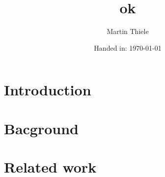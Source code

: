 \documentclass[11pt, a4paper]{memoir}
\author{Martin Thiele}
\title{ok}
\subtitle{} %
\date{Handed in: \today}
\begin{document}
\maketitle
\tableofcontents

\begin{abstract}
\lipsum[1]
\end{abstract}
\section{Introduction}
\section{Bacground}
\section{Related work}



\end{document}

